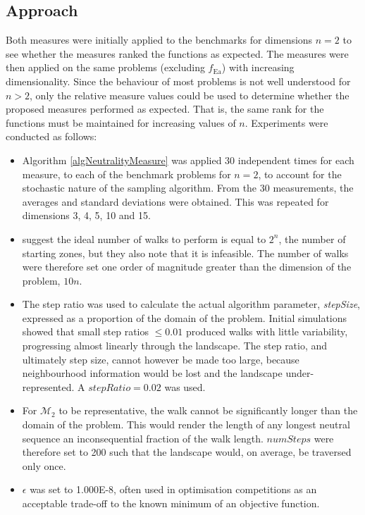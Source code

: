 \documentclass[conference]{IEEEtran}
\begin{document}
\subsection{Approach}
\label{visualApproach}
Both measures were initially applied to the benchmarks for dimensions $n=2$ to see whether the measures ranked the functions as expected. The measures were then applied on the same problems (excluding $f_{\text{Ea}}$) with increasing dimensionality. Since the behaviour of most problems is not well understood for $n>2$, only the relative measure values could be used to determine whether the proposed measures performed as expected. That is, the same rank for the functions must be maintained for increasing values of $n$. Experiments were conducted as follows:
\begin{itemize}
	\item Algorithm \ref{algNeutralityMeasure} was applied 30 independent times for each measure, to each of the benchmark problems for $n=2$, to account for the stochastic nature of the sampling algorithm. From the 30 measurements, the averages and standard deviations were obtained. This was repeated for dimensions 3, 4, 5, 10 and 15.
	\item \citet{malan2014progressive} suggest the ideal number of walks to perform is equal to $2^n$, the number of starting zones, but they also note that it is infeasible. The number of walks were therefore set one order of magnitude greater than the dimension of the problem, $10n$.
	\item The step ratio was used to calculate the actual algorithm parameter, \textit{stepSize}, expressed as a proportion of the domain of the problem. Initial simulations showed that small step ratios $\le 0.01$ produced walks with little variability, progressing almost linearly through the landscape. The step ratio, and ultimately step size, cannot however be made too large, because neighbourhood information would be lost and the landscape under-represented. A $\textit{stepRatio} = 0.02$ was used.
	\item For $\mathcal{M}_2$ to be representative, the walk cannot be significantly longer than the domain of the problem. This would render the length of any longest neutral sequence an inconsequential fraction of the walk length. $numSteps$ were therefore set to 200 such that the landscape would, on average, be traversed only once.
	\item $\epsilon$ was set to 1.000E-8, often used in optimisation competitions as an acceptable trade-off to the known minimum of an objective function.
\end{itemize}
\end{document}
